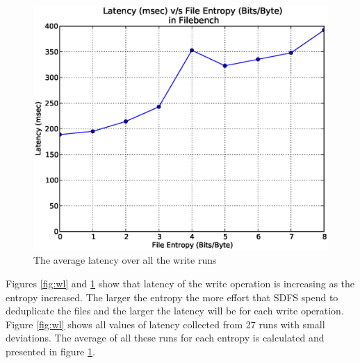 \begin{figure}[H]
\begin{center}
\includegraphics[scale=.55]{../results/set1/write_latency_avg.eps}
\caption{The average latency over all the write runs}
\label{fig:wlavg}
\end{center}
\end{figure}
\noindent Figures \ref{fig:wl} and \ref{fig:wlavg} show that latency of the write operation is increasing as the entropy increased. The larger the entropy the more effort that SDFS spend to deduplicate the files and the larger the latency will be for each write operation. Figure \ref{fig:wl} shows all values of latency collected from 27 runs with small deviations. The average of all these runs for each entropy is calculated and presented in figure \ref{fig:wlavg}.

